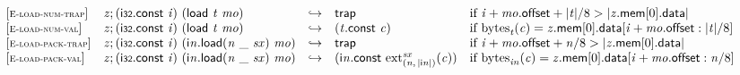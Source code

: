 $$
\begin{array}{@{}l@{}lcl@{}l@{}}
{[\textsc{\scriptsize E{-}load{-}num{-}trap}]} \quad & {\mathit{z}} ; (\mathsf{i{\scriptstyle32}}.\mathsf{const}~{\mathit{i}})~(\mathsf{load}~{\mathit{t}}~{\mathit{mo}}) &\hookrightarrow& \mathsf{trap} &\quad
  \mbox{if}~{\mathit{i}} + {\mathit{mo}}.\mathsf{offset} + {|{\mathit{t}}|} / 8 > {|{{\mathit{z}}.\mathsf{mem}}{[0]}.\mathsf{data}|} \\
{[\textsc{\scriptsize E{-}load{-}num{-}val}]} \quad & {\mathit{z}} ; (\mathsf{i{\scriptstyle32}}.\mathsf{const}~{\mathit{i}})~(\mathsf{load}~{\mathit{t}}~{\mathit{mo}}) &\hookrightarrow& ({\mathit{t}}.\mathsf{const}~{\mathit{c}}) &\quad
  \mbox{if}~{{\mathrm{bytes}}}_{{\mathit{t}}}({\mathit{c}}) = {{\mathit{z}}.\mathsf{mem}}{[0]}.\mathsf{data}[{\mathit{i}} + {\mathit{mo}}.\mathsf{offset} : {|{\mathit{t}}|} / 8] \\
{[\textsc{\scriptsize E{-}load{-}pack{-}trap}]} \quad & {\mathit{z}} ; (\mathsf{i{\scriptstyle32}}.\mathsf{const}~{\mathit{i}})~({{\mathsf{i}}{{\mathit{n}}}.\mathsf{load}}{({\mathit{n}}~\mathsf{\_}~{\mathit{sx}})}~{\mathit{mo}}) &\hookrightarrow& \mathsf{trap} &\quad
  \mbox{if}~{\mathit{i}} + {\mathit{mo}}.\mathsf{offset} + {\mathit{n}} / 8 > {|{{\mathit{z}}.\mathsf{mem}}{[0]}.\mathsf{data}|} \\
{[\textsc{\scriptsize E{-}load{-}pack{-}val}]} \quad & {\mathit{z}} ; (\mathsf{i{\scriptstyle32}}.\mathsf{const}~{\mathit{i}})~({{\mathsf{i}}{{\mathit{n}}}.\mathsf{load}}{({\mathit{n}}~\mathsf{\_}~{\mathit{sx}})}~{\mathit{mo}}) &\hookrightarrow& ({\mathsf{i}}{{\mathit{n}}}.\mathsf{const}~{{{{\mathrm{ext}}}_{({\mathit{n}},\, {|{\mathsf{i}}{{\mathit{n}}}|})}^{{\mathit{sx}}}}}{({\mathit{c}})}) &\quad
  \mbox{if}~{{\mathrm{bytes}}}_{{{\mathit{i}}}{{\mathit{n}}}}({\mathit{c}}) = {{\mathit{z}}.\mathsf{mem}}{[0]}.\mathsf{data}[{\mathit{i}} + {\mathit{mo}}.\mathsf{offset} : {\mathit{n}} / 8] \\
\end{array}
$$

\vspace{1ex}

